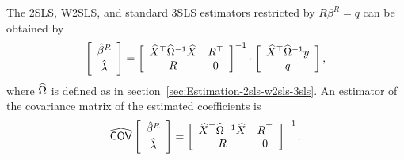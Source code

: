 The 2SLS, W2SLS, and standard 3SLS estimators
restricted by $R \beta^R = q$ can be obtained by
\begin{equation}
   \left[ \begin{array}{c}
      \hat{\beta}^R \\[0.2em] \hat{\lambda}
   \end{array} \right]
   =
   \left[ \begin{array}{cc}
      \widehat{X}^\top \widehat{\Omega}^{-1} \widehat{X} & R^\top \\
      R & 0
   \end{array} \right]^{-1}
   \cdot
   \left[ \begin{array}{c}
      \widehat{X}^\top \widehat{\Omega}^{-1} y \\ q
   \end{array} \right] ,
   \label{eq:2sls-w2sls-3sls-r}
\end{equation}
where $\widehat{\Omega}$ is defined as in section~\ref{sec:Estimation-2sls-w2sls-3sls}.
An estimator of the covariance matrix of the estimated coefficients is
\begin{equation}
   \widehat{\mathsf{COV}}
   \left[ \begin{array}{c}
      \hat{\beta}^R \\[0.2em] \hat{\lambda}
   \end{array} \right] 
   = 
   \left[ \begin{array}{cc}
      \widehat{X}^\top \widehat{\Omega}^{-1} \widehat{X} & R^\top \\
      R & 0
   \end{array} \right]^{-1} .
   \label{eq:cov-2sls-w2sls-3sls-r}
\end{equation}

